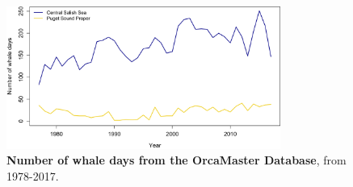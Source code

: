 \documentclass{article}
\begin{document}
\begin{figure}[p]
\includegraphics[width=0.8\textwidth]{../analyses/figures/OrcaPhenPlots/whaledays_assumeSRKW2regs.png} 
\caption{\textbf{Number of whale days from the OrcaMaster Database}, from 1978-2017. }
\label{fig:wdays}
\end{figure}
\end{document}
